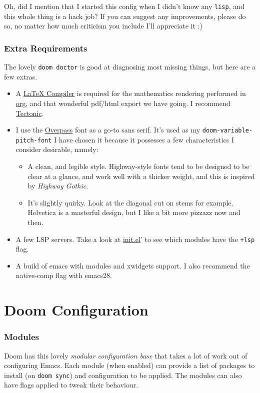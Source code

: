 \documentclass{scrartcl}
\begin{document}
Oh, did I mention that I started this config when I didn't know any \texttt{lisp}, and
this whole thing is a hack job? If you can suggest any improvements, please do
so, no matter how much criticism you include I'll appreciate it :)

\subsubsection{Extra Requirements}
\label{sec:orgee2a4da}
The lovely \texttt{doom doctor} is good at diagnosing most missing things, but here are a
few extras.
\begin{itemize}
\item A \href{https://www.tug.org/texlive/}{\LaTeX{} Compiler} is required for the mathematics rendering performed in \href{https://orgmode.org/}{org},
and that wonderful pdf/html export we have going. I recommend \href{https://github.com/tectonic-typesetting/tectonic}{Tectonic}.
\item I use the \href{https://overpassfont.org/}{Overpass} font as a go-to sans serif.
It's used as my \texttt{doom-variable-pitch-font}
I have chosen it because it possesses a few characteristics I consider
desirable, namely:
\begin{itemize}
\item A clean, and legible style. Highway-style fonts tend to be designed to be
clear at a glance, and work well with a thicker weight, and this is inspired
by \emph{Highway Gothic}.
\item It's slightly quirky. Look at the diagonal cut on stems for example.
Helvetica is a masterful design, but I like a bit more pizzazz now and then.
\end{itemize}
\item A few LSP servers. Take a look at \href{init.el}{init.el}' to see which modules have the \texttt{+lsp}
flag.
\item A build of emacs with modules and xwidgets support. I also recommend the
native-comp flag with emacs28.
\end{itemize}

\section{Doom Configuration}
\label{sec:orge06c79f}
\subsubsection{Modules}
\label{sec:org7e39f1a}
Doom has this lovely \emph{modular configuration base} that takes a lot of work out of
configuring Emacs. Each module (when enabled) can provide a list of packages to
install (on \texttt{doom sync}) and configuration to be applied. The modules can also
have flags applied to tweak their behaviour.
\end{document}
